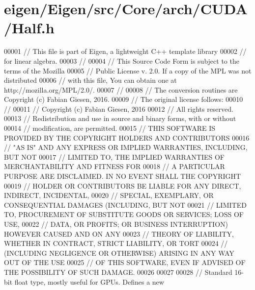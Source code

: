 \hypertarget{eigen_2_eigen_2src_2_core_2arch_2_c_u_d_a_2_half_8h_source}{}\section{eigen/\+Eigen/src/\+Core/arch/\+C\+U\+D\+A/\+Half.h}
\label{eigen_2_eigen_2src_2_core_2arch_2_c_u_d_a_2_half_8h_source}

\begin{DoxyCode}
00001 \textcolor{comment}{// This file is part of Eigen, a lightweight C++ template library}
00002 \textcolor{comment}{// for linear algebra.}
00003 \textcolor{comment}{//}
00004 \textcolor{comment}{// This Source Code Form is subject to the terms of the Mozilla}
00005 \textcolor{comment}{// Public License v. 2.0. If a copy of the MPL was not distributed}
00006 \textcolor{comment}{// with this file, You can obtain one at http://mozilla.org/MPL/2.0/.}
00007 \textcolor{comment}{//}
00008 \textcolor{comment}{// The conversion routines are Copyright (c) Fabian Giesen, 2016.}
00009 \textcolor{comment}{// The original license follows:}
00010 \textcolor{comment}{//}
00011 \textcolor{comment}{// Copyright (c) Fabian Giesen, 2016}
00012 \textcolor{comment}{// All rights reserved.}
00013 \textcolor{comment}{// Redistribution and use in source and binary forms, with or without}
00014 \textcolor{comment}{// modification, are permitted.}
00015 \textcolor{comment}{// THIS SOFTWARE IS PROVIDED BY THE COPYRIGHT HOLDERS AND CONTRIBUTORS}
00016 \textcolor{comment}{// "AS IS" AND ANY EXPRESS OR IMPLIED WARRANTIES, INCLUDING, BUT NOT}
00017 \textcolor{comment}{// LIMITED TO, THE IMPLIED WARRANTIES OF MERCHANTABILITY AND FITNESS FOR}
00018 \textcolor{comment}{// A PARTICULAR PURPOSE ARE DISCLAIMED. IN NO EVENT SHALL THE COPYRIGHT}
00019 \textcolor{comment}{// HOLDER OR CONTRIBUTORS BE LIABLE FOR ANY DIRECT, INDIRECT, INCIDENTAL,}
00020 \textcolor{comment}{// SPECIAL, EXEMPLARY, OR CONSEQUENTIAL DAMAGES (INCLUDING, BUT NOT}
00021 \textcolor{comment}{// LIMITED TO, PROCUREMENT OF SUBSTITUTE GOODS OR SERVICES; LOSS OF USE,}
00022 \textcolor{comment}{// DATA, OR PROFITS; OR BUSINESS INTERRUPTION) HOWEVER CAUSED AND ON ANY}
00023 \textcolor{comment}{// THEORY OF LIABILITY, WHETHER IN CONTRACT, STRICT LIABILITY, OR TORT}
00024 \textcolor{comment}{// (INCLUDING NEGLIGENCE OR OTHERWISE) ARISING IN ANY WAY OUT OF THE USE}
00025 \textcolor{comment}{// OF THIS SOFTWARE, EVEN IF ADVISED OF THE POSSIBILITY OF SUCH DAMAGE.}
00026 
00027 
00028 \textcolor{comment}{// Standard 16-bit float type, mostly useful for GPUs. Defines a new}

\end{DoxyCode}
